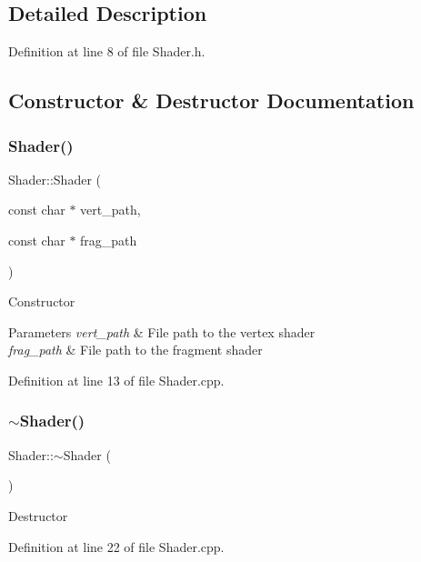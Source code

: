 \subsection{Detailed Description}


Definition at line 8 of file Shader.\+h.



\subsection{Constructor \& Destructor Documentation}
\mbox{\label{class_shader_ae2a0af7abf90c72ab25a394a24ea92f1}} 
\subsubsection{\texorpdfstring{Shader()}{Shader()}}
{\footnotesize\ttfamily Shader\+::\+Shader (\begin{DoxyParamCaption}\item[{const char $\ast$}]{vert\+\_\+path,  }\item[{const char $\ast$}]{frag\+\_\+path }\end{DoxyParamCaption})}

Constructor 
\begin{DoxyParams}{Parameters}
{\em vert\+\_\+path} & File path to the vertex shader \\
\hline
{\em frag\+\_\+path} & File path to the fragment shader \\
\hline
\end{DoxyParams}


Definition at line 13 of file Shader.\+cpp.

\mbox{\label{class_shader_aff01df87e8a102f270b5b135a295e59d}} 
\subsubsection{\texorpdfstring{$\sim$\+Shader()}{~Shader()}}
{\footnotesize\ttfamily Shader\+::$\sim$\+Shader (\begin{DoxyParamCaption}{ }\end{DoxyParamCaption})}

Destructor 

Definition at line 22 of file Shader.\+cpp.



